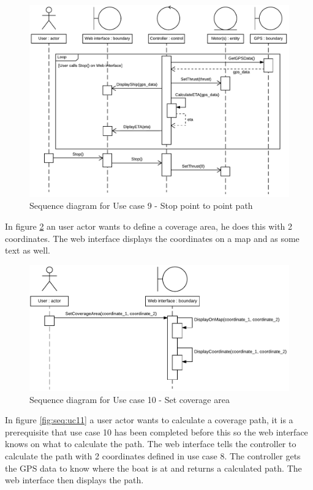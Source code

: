 \begin{figure}[H]
	\centering
	\includegraphics[width=1\linewidth]{Images/System_architecture/Use_case_9_SD}
	\caption{Sequence diagram for Use case 9 - Stop point to point path}
	\label{fig:seq:uc9}
\end{figure}

In figure \ref{fig:seq:uc10} an user actor wants to define a coverage area, he does this with 2 coordinates. The web interface displays the coordinates on a map and as some text as well. 

\begin{figure}[H]
	\centering
	\includegraphics[width=1\linewidth]{Images/System_architecture/Use_case_10_SD}
	\caption{Sequence diagram for Use case 10 - Set coverage area}
	\label{fig:seq:uc10}
\end{figure}

In figure \ref{fig:seq:uc11} a user actor wants to calculate a coverage path, it is a prerequisite that use case 10 has been completed before this so the web interface knows on what to calculate the path. The web interface tells the controller to calculate the path with 2 coordinates defined in use case 8. The controller gets the GPS data to know where the boat is at and returns a calculated path. The web interface then displays the path.

